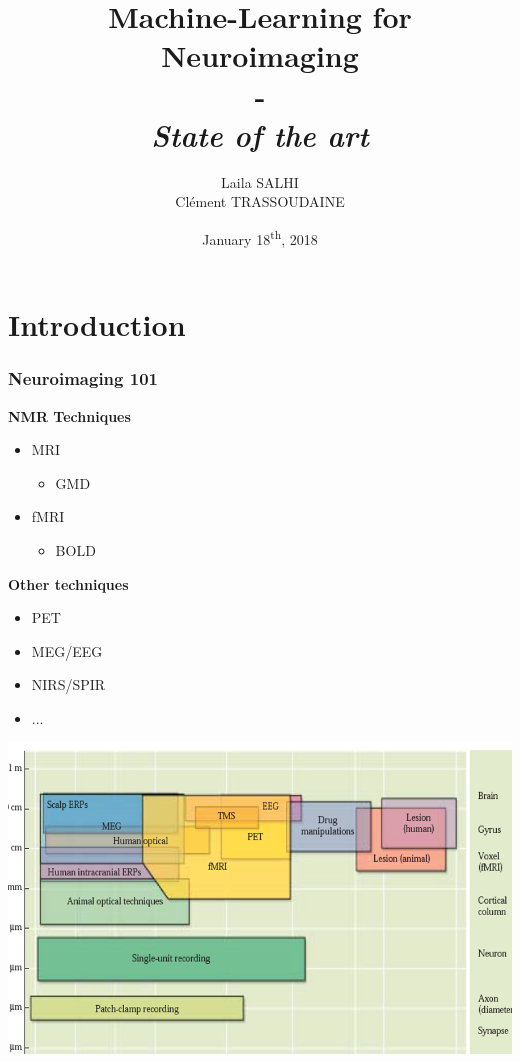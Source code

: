 \documentclass{beamer}
\institute[EURECOM]{\textbf{EURECOM}}
\date{January 18\textsuperscript{th}, 2018}
\author{Laila SALHI\\Clément TRASSOUDAINE}
\title{
	\textbf{Machine-Learning for Neuroimaging}\\
	-\\ 
	\textit{State of the art}
}
\begin{document}
\frame{\titlepage}
\frame{\tableofcontents}



\section{Introduction}

\begin{frame}
\frametitle{Neuroimaging 101}
\begin{minipage}{0.45\linewidth}
{\textbf{NMR Techniques}}
\begin{itemize}
\item MRI
	\begin{itemize}
	\item GMD
	\end{itemize}
\item fMRI
	\begin{itemize}
	\item BOLD
	\end{itemize}
\end{itemize}
\end{minipage}
\hfill
\begin{minipage}{0.45\linewidth}
{\textbf{Other techniques}}
\begin{itemize}
\item PET
\item MEG/EEG
\item NIRS/SPIR
\item ...
\end{itemize}
\vfill
\end{minipage}
\vfill
\includegraphics[scale=.3]{resolutions.png}

\end{frame}
\end{document}
